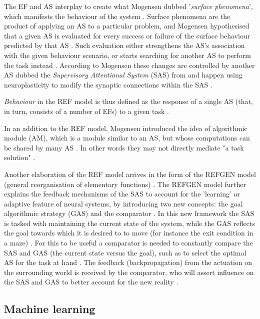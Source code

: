 \documentclass[a4paper,oneside]{memoir}
\begin{document}
The EF and AS interplay to create what Mogensen dubbed '\textit{surface
phenomena}', which manifests the behaviour of the system \autocite{Mogensen2011}.
Surface phenomena are the product of applying an AS to a particular problem,
and Mogensen hypothesised that a given AS is evaluated for every success or
failure of the surface behaviour predicted by that AS \autocite{Mogensen2011}.
Such evaluation either strengthens the AS's association with the given
behaviour scenario, or starts searching for another AS to perform the task
instead \autocite{Mogensen2011}. According to Mogensen these changes
are controlled by another AS dubbed the \textit{Supervisory Attentional
System} (SAS) from \autocite{Norman1986} and happen using neuroplasticity to
modify the synaptic connections within the SAS \autocite{Mogensen2011}.

\textit{Behaviour} in the REF model is thus defined as the response of a single
AS (that, in turn, consists of a number of EFs) to a given task
\autocite{Mogensen2011, Mogensen2012b}.

In an addition to the REF model, Mogensen introduced the idea of algorithmic
module (AM), which is a module similar to an AS, but whose computations can be
shared by many AS \autocite{Mogensen2012b}. In other words they may not
directly mediate "a task solution" \autocite{Mogensen2017}.

Another elaboration of the REF model arrives in the form of the REFGEN
model (general reorganisation of elementary functions) \autocite{Mogensen2017}.
The REFGEN model further explains the feedback mechanisms of the SAS
to account for the 'learning' or adaptive feature of neural systems, by
introducing two new concepts: the goal algorithmic strategy (GAS) and the
comparator \autocite{Mogensen2017, Mogensen2012b}.
In this new framework the SAS is tasked with maintaining the current state
of the system, while the GAS reflects the goal towards which it is desired to
to move (for instance the exit condition in a maze) \autocite{Mogensen2017}.
For this to be useful a comparator is needed to constantly compare the SAS
and GAS (the current state versus the goal), such as to select the optimal AS
for the task at hand \autocite{Mogensen2017}. The feedback (backpropagation)
from the actuation on the surrounding world is received by the comparator,
who will assert influence on the SAS and GAS to better account for the new
reality \autocite{Mogensen2017}.


\subsection{Machine learning}
\end{document}
